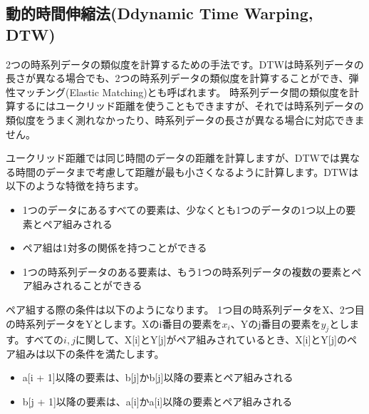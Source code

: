 \subsection{動的時間伸縮法(Ddynamic Time Warping, DTW)}
2つの時系列データの類似度を計算するための手法です。DTWは時系列データの長さが異なる場合でも、2つの時系列データの類似度を計算することができ、弾性マッチング(Elastic Matching)とも呼ばれます。
時系列データ間の類似度を計算するにはユークリッド距離を使うこともできますが、それでは時系列データの類似度をうまく測れなかったり、時系列データの長さが異なる場合に対応できません。

\begin{center}
\end{center}

\vspace{0.5cm}

ユークリッド距離では同じ時間のデータの距離を計算しますが、DTWでは異なる時間のデータまで考慮して距離が最も小さくなるように計算します。DTWは以下のような特徴を持ちます。

\begin{itemize}
  \item 1つのデータにあるすべての要素は、少なくとも1つのデータの1つ以上の要素とペア組みされる
  \item ペア組は1対多の関係を持つことができる
  \item 1つの時系列データのある要素は、もう1つの時系列データの複数の要素とペア組みされることができる
\end{itemize}

ペア組する際の条件は以下のようになります。
1つ目の時系列データをX、2つ目の時系列データをYとします。Xのi番目の要素を$x_i$、Yのj番目の要素を$y_j$とします。すべての$i, j$に関して、X[i]とY[j]がペア組みされているとき、X[i]とY[j]のペア組みは以下の条件を満たします。
\begin{itemize}
  \item a[i + 1]以降の要素は、b[j]かb[j]以降の要素とペア組みされる
  \item b[j + 1]以降の要素は、a[i]かa[i]以降の要素とペア組みされる
\end{itemize}

